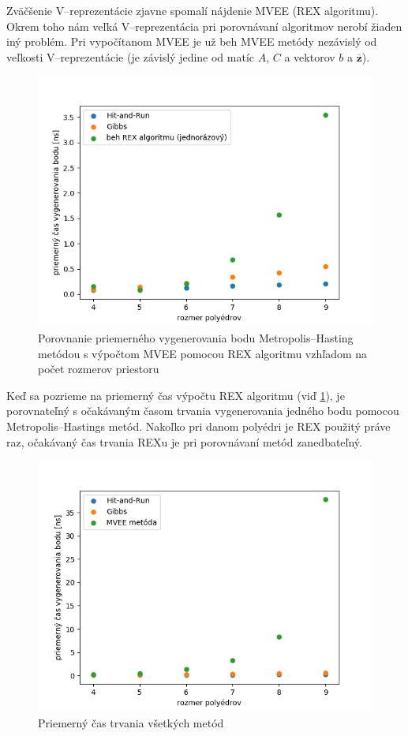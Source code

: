 Zväčšenie V--reprezentácie zjavne spomalí nájdenie MVEE (REX algoritmu). Okrem toho nám veľká V--reprezentácia pri porovnávaní algoritmov nerobí žiaden iný problém. Pri vypočítanom MVEE je už beh MVEE metódy nezávislý od veľkosti V--reprezentácie (je závislý jedine od matíc $A$, $C$ a vektorov $b$ a $\mathbf{\overline z}$).\\

\begin{figure} [H]
	\includegraphics[width=\linewidth]{images/mh_rex.png}
	\caption{Porovnanie priemerného vygenerovania bodu Metropolis--Hasting metódou s výpočtom MVEE pomocou REX algoritmu vzhľadom na počet rozmerov priestoru}
	\label{fig:mh_rex}
\end{figure}

Keď sa pozrieme na priemerný čas výpočtu REX algoritmu (viď \ref{fig:mh_rex}), je porovnateľný s očakávaným časom trvania vygenerovania jedného bodu pomocou Metropolis--Hastings metód. Nakoľko pri danom polyédri je REX použitý práve raz, očakávaný čas trvania REXu je pri porovnávaní metód zanedbateľný.\\

\begin{figure} [H]
  \includegraphics[width=\linewidth]{images/vsetky.png}
  \caption{Priemerný čas trvania všetkých metód}
  \label{fig:vsetky}
\end{figure}

